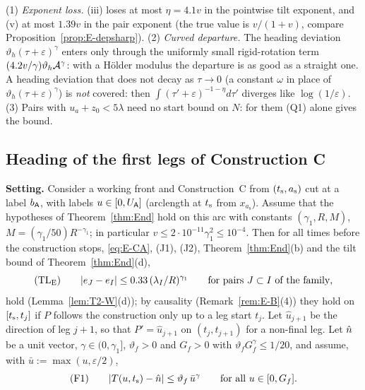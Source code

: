 \begin{remark}\label{rem:T2-D}
(1) \emph{Exponent loss.} (iii) loses at most $\eta=4.1v$ in the pointwise tilt exponent, and (v) at most $1.39v$ in the pair
exponent (the true value is $v/(1+v)$, compare Proposition~\ref{prop:E-depsharp}).
(2) \emph{Curved departure.} The heading deviation $\vartheta_h(\tau+\varepsilon)^\gamma$ enters only through the uniformly small
rigid-rotation term $(4.2v/\gamma)\vartheta_h\mathcal A^\gamma$: with a H\"older modulus the departure is as good as a straight one. A
heading deviation that does not decay as $\tau\to0$ (a constant $\omega$ in place of $\vartheta_h(\tau+\varepsilon)^\gamma$) is
\emph{not} covered: then $\int(\tau'+\varepsilon)^{-1-\eta}d\tau'$ diverges like $\log(1/\varepsilon)$.
(3) Pairs with $u_a+z_0<5\lambda$ need no start bound on $N$: for them (Q1) alone gives the bound.
\end{remark}

\subsection{Heading of the first legs of Construction C}

\noindent\textbf{Setting.} Consider a working front and Construction~C from $(t_{\mathrm s},a_{\mathrm s})$ cut at a label $b_{\mathsf A}$, with
labels $u\in[0,U_{\mathsf A}]$ (arclength at $t_{\mathrm s}$ from $x_{a_{\mathrm s}}$). Assume that the hypotheses of Theorem~\ref{thm:End} hold on
this arc with constants $(\gamma_1,R,M)$, $M=(\gamma_1/50)R^{-\gamma_1}$; in particular $v\le2\cdot10^{-11}\gamma_1^2\le10^{-4}$.
Then for all times before the construction stops, \eqref{eq:E-CA}, (J1), (J2), Theorem~\ref{thm:End}(b) and the tilt bound of
Theorem~\ref{thm:End}(d),
\[
\textup{(TL$_{\mathrm E}$)}\qquad|e_J-e_I|\le0.33\,(\lambda_I/R)^{\gamma_1}\qquad\text{for pairs }J\subset I\text{ of the family},
\]
hold (Lemma~\ref{lem:T2-W}(d)); by causality (Remark~\ref{rem:E-B}(4)) they hold on $[t_{\mathrm s},t_j]$ if $P$ follows the construction
only up to a leg start $t_j$. Let $\hat u_{j+1}$ be the direction of leg $j+1$, so that $P'=\hat u_{j+1}$ on $(t_j,t_{j+1})$ for a
non-final leg. Let $\hat n$ be a unit vector, $\gamma\in(0,\gamma_1]$, $\vartheta_f>0$ and $G_f>0$ with
$\vartheta_fG_f^\gamma\le1/20$, and assume, with $\bar u:=\max(u,\varepsilon/2)$,
\[
\textup{(F1)}\qquad|T(u,t_{\mathrm s})-\hat n|\le\vartheta_f\,\bar u^\gamma\qquad\text{for all }u\in[0,G_f].
\]

